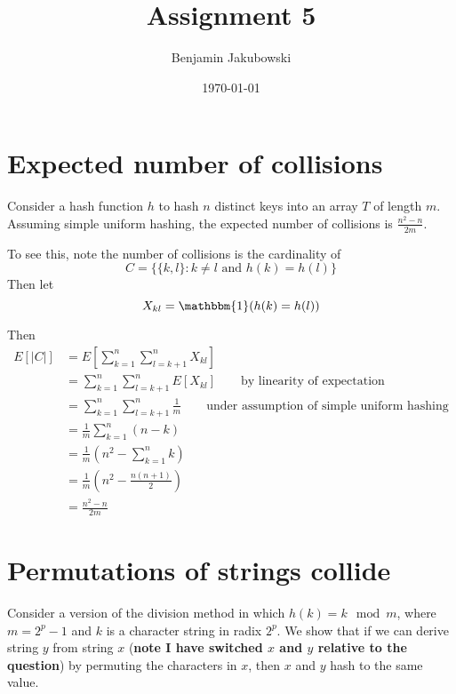 \documentclass[paper=a4, fontsize=11pt]{scrartcl} %
\title{	Assignment 5}
\author{Benjamin Jakubowski} %
\date{\normalsize\today} %
\numberwithin{equation}{section} %
\numberwithin{figure}{section} %
\numberwithin{table}{section} %
\begin{document}
\maketitle %

\section{Expected number of collisions}

Consider a hash function $h$ to hash $n$ distinct keys into an array $T$ of length $m$. Assuming simple uniform hashing, the expected number of collisions is $\frac{n^2 - n}{2m}$.

To see this, note the number of collisions is the cardinality of
\[C = \{\{k,l\}: k \ne l \textrm{ and } h(k) = h(l)\}\]
Then let
\[X_{kl} = \mathbbm{1}(h(k) = h(l))\]

Then
\begin{align*}
E[|C|] &= E\left[\sum_{k=1}^n \sum_{l = k+1}^n X_{kl} \right] \\
	&= \sum_{k=1}^n \sum_{l = k+1}^n E[X_{kl}] \qquad{} \textrm{by linearity of expectation}\\
	&= \sum_{k=1}^n \sum_{l = k+1}^n \frac{1}{m} \qquad{} \textrm{under assumption of simple uniform hashing}\\
	&= \frac{1}{m} \sum_{k=1}^n (n-k) \\
	&= \frac{1}{m} \left(n^2 - \sum_{k=1}^n k \right) \\
	&= \frac{1}{m} \left(n^2 - \frac{n(n+1)}{2}\right) \\
	&= \frac{n^2-n}{2m}
\end{align*}

\section{Permutations of strings collide}

Consider a version of the division method in which $h(k) = k \mod m$, where $m = 2^p - 1$ and $k$ is a character string in radix $2^p$. We show that if we can derive string $y$ from string $x$ (\textbf{note I have switched $x$ and $y$ relative to the question}) by permuting the characters in $x$, then $x$ and $y$ hash to the same value.
\end{document}
